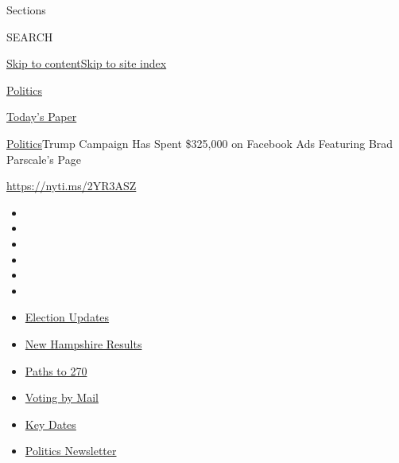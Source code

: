 Sections

SEARCH

\protect\hyperlink{site-content}{Skip to
content}\protect\hyperlink{site-index}{Skip to site index}

\href{https://www.nytimes3xbfgragh.onion/section/politics}{Politics}

\href{https://myaccount.nytimes3xbfgragh.onion/auth/login?response_type=cookie\&client_id=vi}{}

\href{https://www.nytimes3xbfgragh.onion/section/todayspaper}{Today's
Paper}

\href{/section/politics}{Politics}\textbar{}Trump Campaign Has Spent
\$325,000 on Facebook Ads Featuring Brad Parscale's Page

\url{https://nyti.ms/2YR3ASZ}

\begin{itemize}
\item
\item
\item
\item
\item
\item
\end{itemize}

\begin{itemize}
\item
  \href{https://www.nytimes3xbfgragh.onion/live/2020/09/09/us/trump-vs-biden?action=click\&pgtype=Article\&state=default\&region=TOP_BANNER\&context=storylines_menu}{Election
  Updates}
\item
  \href{https://www.nytimes3xbfgragh.onion/interactive/2020/09/08/us/elections/results-new-hampshire-primary-elections.html?action=click\&pgtype=Article\&state=default\&region=TOP_BANNER\&context=storylines_menu}{New
  Hampshire Results}
\item
  \href{https://www.nytimes3xbfgragh.onion/interactive/2020/us/elections/election-states-biden-trump.html?action=click\&pgtype=Article\&state=default\&region=TOP_BANNER\&context=storylines_menu}{Paths
  to 270}
\item
  \href{https://www.nytimes3xbfgragh.onion/interactive/2020/08/31/us/politics/vote-by-mail-deadlines.html?action=click\&pgtype=Article\&state=default\&region=TOP_BANNER\&context=storylines_menu}{Voting
  by Mail}
\item
  \href{https://www.nytimes3xbfgragh.onion/interactive/2019/us/elections/2020-presidential-election-calendar.html?action=click\&pgtype=Article\&state=default\&region=TOP_BANNER\&context=storylines_menu}{Key
  Dates}
\item
  \href{https://www.nytimes3xbfgragh.onion/newsletters/politics?action=click\&pgtype=Article\&state=default\&region=TOP_BANNER\&context=storylines_menu}{Politics
  Newsletter}
\end{itemize}

